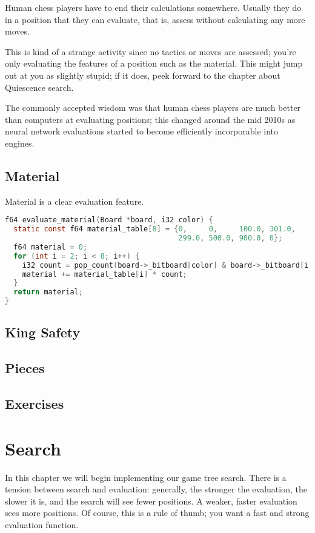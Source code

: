 \documentclass[letterpaper,11pt]{article}
\begin{document}
Human chess players have to end their calculations somewhere. Usually they do in a position 
that they can evaluate, that is, assess without calculating any more moves.

This is kind of a strange activity since no tactics or moves are assessed; you're only 
evaluating the features of a position such as the material. This might jump out at you as 
slightly stupid; if it does, peek forward to the chapter about Quiescence search.

The commonly accepted wisdom was that human chess players are
much better than computers at evaluating positions;
this changed around the mid 2010s as neural network evaluations started to become 
efficiently incorporable into engines. 

\subsection{Material}

Material is a clear evaluation feature.
\begin{lstlisting}[language=C]
f64 evaluate_material(Board *board, i32 color) {
  static const f64 material_table[8] = {0,     0,     100.0, 301.0,
                                        299.0, 500.0, 900.0, 0};
  f64 material = 0;
  for (int i = 2; i < 8; i++) {
    i32 count = pop_count(board->_bitboard[color] & board->_bitboard[i]);
    material += material_table[i] * count;
  }
  return material;
}
\end{lstlisting}
\subsection{King Safety}



\subsection{Pieces}
\subsection{Exercises}

\section{Search}

In this chapter we will begin implementing our game tree search. There is a tension between
search and evaluation: generally, the stronger the evaluation, the slower it is,
and the search will see fewer positions. A weaker, faster evaluation sees more positions.
Of course, this is a rule of thumb; you want a fast and strong evaluation function. 
\end{document}
